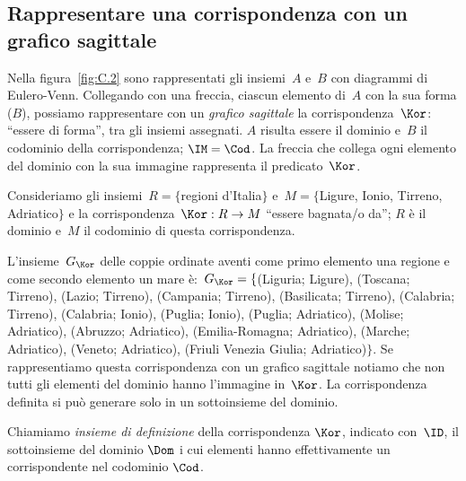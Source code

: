 \subsection{Rappresentare una corrispondenza con un grafico sagittale}

\begin{exrig}
 \begin{esempio}
 Nella figura~\ref{fig:C.2} sono rappresentati gli insiemi~$A$ e~$B$ con diagrammi di Eulero-Venn.
 Collegando con una freccia, ciascun elemento di~$A$ con la sua forma ($B$), possiamo rappresentare
 con un \emph{grafico sagittale} la corrispondenza~$\Kor$: ``essere di forma'', tra gli insiemi
 assegnati. $A$ risulta essere il dominio e~$B$ il codominio della corrispondenza; $\IM=\Cod$.
 La freccia che collega ogni elemento del dominio con la sua immagine rappresenta il predicato~$\Kor$.
\end{esempio}
\end{exrig}

\ovalbox{\risolvi \ref{ese:C.3}}

\begin{exrig}
\begin{esempio}
Consideriamo gli insiemi~$R= \{$regioni d'Italia$\}$ e~$M= \{$Ligure, Ionio, Tirreno, Adriatico$\}$ e la corrispondenza~$\Kor:R \rightarrow M$ ``essere bagnata/o da''; $R$ è il dominio e~$M$
il codominio di questa corrispondenza.

L'insieme~$G_\Kor$ delle coppie ordinate aventi come primo elemento una regione e come secondo elemento un mare
è:~$G_\Kor= \{$(Liguria; Ligure), (Toscana; Tirreno), (Lazio; Tirreno), (Campania; Tirreno), (Basilicata; Tirreno), (Calabria; Tirreno), (Calabria; Ionio), (Puglia; Ionio), 
(Puglia; Adriatico), (Molise; Adriatico), (Abruzzo; Adriatico), (Emilia-Romagna; Adriatico), (Marche; Adriatico), (Veneto; Adriatico), (Friuli Venezia Giulia; Adriatico)$\}$.
Se rappresentiamo questa corrispondenza con un grafico sagittale notiamo che non tutti gli elementi del dominio hanno l'immagine in~$\Kor$. La corrispondenza definita
si può generare solo in un sottoinsieme del dominio.
\end{esempio}
\end{exrig}

\begin{definizione}
Chiamiamo \emph{insieme di definizione} della corrispondenza $\Kor$, indicato con~$\ID$, il sottoinsieme del dominio $\Dom$ i cui elementi hanno effettivamente un corrispondente nel codominio $\Cod$.
\end{definizione}

